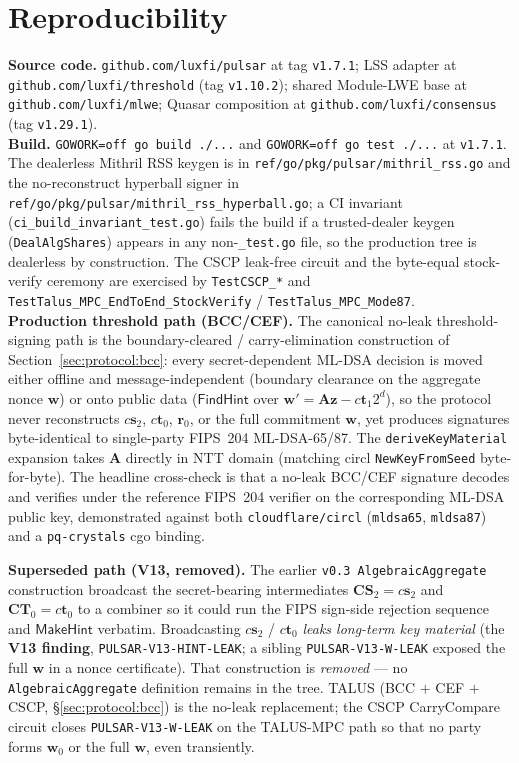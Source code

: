 \documentclass[11pt,a4paper]{article}
\begin{document}
\section*{Reproducibility}
\textbf{Source code.} \texttt{github.com/luxfi/pulsar} at tag \texttt{v1.7.1}; LSS adapter at \texttt{github.com/luxfi/threshold} (tag \texttt{v1.10.2}); shared Module-LWE base at \texttt{github.com/luxfi/mlwe}; Quasar composition at \texttt{github.com/luxfi/consensus} (tag \texttt{v1.29.1}).\\
\textbf{Build.} \texttt{GOWORK=off go build ./...} and \texttt{GOWORK=off go test ./...} at \texttt{v1.7.1}. The dealerless Mithril RSS keygen is in \texttt{ref/go/pkg/pulsar/mithril\_rss.go} and the no-reconstruct hyperball signer in \texttt{ref/go/pkg/pulsar/mithril\_rss\_hyperball.go}; a CI invariant (\texttt{ci\_build\_invariant\_test.go}) fails the build if a trusted-dealer keygen (\texttt{DealAlgShares}) appears in any non-\texttt{\_test.go} file, so the production tree is dealerless by construction. The CSCP leak-free circuit and the byte-equal stock-verify ceremony are exercised by \texttt{TestCSCP\_*} and \texttt{TestTalus\_MPC\_EndToEnd\_StockVerify} / \texttt{TestTalus\_MPC\_Mode87}.\\
\textbf{Production threshold path (BCC/CEF).} The canonical no-leak threshold-signing path is the boundary-cleared / carry-elimination construction of Section~\ref{sec:protocol:bcc}: every secret-dependent ML-DSA decision is moved either offline and message-independent (boundary clearance on the aggregate nonce $\mathbf{w}$) or onto public data ($\mathsf{FindHint}$ over $\mathbf{w}' = \mathbf{A}\mathbf{z} - c\mathbf{t}_1 2^d$), so the protocol never reconstructs $c\mathbf{s}_2$, $c\mathbf{t}_0$, $\mathbf{r}_0$, or the full commitment $\mathbf{w}$, yet produces signatures byte-identical to single-party FIPS~204 ML-DSA-65/87. The \texttt{deriveKeyMaterial} expansion takes $\mathbf{A}$ directly in NTT domain (matching circl \texttt{NewKeyFromSeed} byte-for-byte). The headline cross-check is that a no-leak BCC/CEF signature decodes and verifies under the reference FIPS~204 verifier on the corresponding ML-DSA public key, demonstrated against both \texttt{cloudflare/circl} (\texttt{mldsa65}, \texttt{mldsa87}) and a \texttt{pq-crystals} cgo binding.

\textbf{Superseded path (V13, removed).} The earlier \texttt{v0.3 AlgebraicAggregate} construction broadcast the secret-bearing intermediates $\mathbf{C}\mathbf{S}_2 = c\mathbf{s}_2$ and $\mathbf{C}\mathbf{T}_0 = c\mathbf{t}_0$ to a combiner so it could run the FIPS sign-side rejection sequence and $\mathsf{MakeHint}$ verbatim. Broadcasting $c\mathbf{s}_2$ / $c\mathbf{t}_0$ \emph{leaks long-term key material} (the \textbf{V13 finding}, \texttt{PULSAR-V13-HINT-LEAK}; a sibling \texttt{PULSAR-V13-W-LEAK} exposed the full $\mathbf{w}$ in a nonce certificate). That construction is \emph{removed} --- no \texttt{AlgebraicAggregate} definition remains in the tree. TALUS (BCC $+$ CEF $+$ CSCP, \S\ref{sec:protocol:bcc}) is the no-leak replacement; the CSCP CarryCompare circuit closes \texttt{PULSAR-V13-W-LEAK} on the TALUS-MPC path so that no party forms $\mathbf{w}_0$ or the full $\mathbf{w}$, even transiently.
\end{document}
